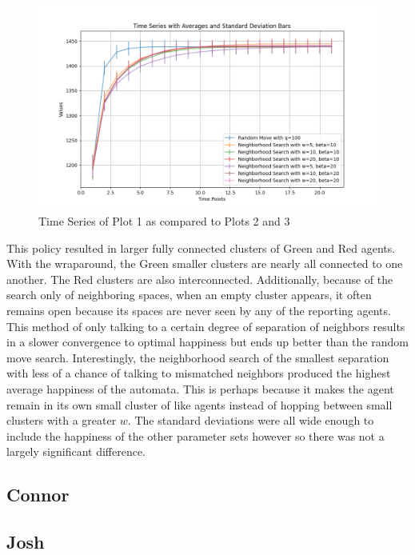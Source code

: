 \documentclass[12pt]{article}
\begin{document}
	\begin{figure}
		\centering
		\includegraphics[width=\textwidth]{policies02.png}
		\caption{Time Series of Plot 1 as compared to Plots 2 and 3}
	\end{figure}
	\FloatBarrier
	
	This policy resulted in larger fully connected clusters of Green and Red agents. With the wraparound, the Green smaller clusters are nearly all connected to one another. The Red clusters are also interconnected. Additionally, because of the search only of neighboring spaces, when an empty cluster appears, it often remains open because its spaces are never seen by any of the reporting agents. This method of only talking to a certain degree of separation of neighbors results in a slower convergence to optimal happiness but ends up better than the random move search. Interestingly, the neighborhood search of the smallest separation with less of a chance of talking to mismatched neighbors produced the highest average happiness of the automata. This is perhaps because it makes the agent remain in its own small cluster of like agents instead of hopping between small clusters with a greater $w$. The standard deviations were all wide enough to include the happiness of the other parameter sets however so there was not a largely significant difference.
	
	\newpage
	
	\subsection{Connor}
	
	
	
	\newpage
	
	\subsection{Josh}
	


\newpage

	
\end{document}
